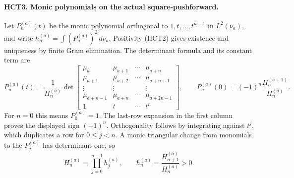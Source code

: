 \paragraph{HCT3. Monic polynomials on the actual square-pushforward.}
Let $P_n^{(a)}(t)$ be the monic polynomial orthogonal to
$1,t,\ldots,t^{n-1}$ in $L^2(\nu_a)$, and write
$h_n^{(a)}=\int(P_n^{(a)})^2\,d\nu_a$.
Positivity (HCT2) gives existence and uniqueness by finite
Gram elimination. The determinant formula and its constant term are
\begin{equation}\tag{HCT7}
 P_n^{(a)}(t)=\frac1{H_n^{(a)}}
 \det\begin{bmatrix}
 \mu_a&\mu_{a+1}&\cdots&\mu_{a+n}\\
 \mu_{a+1}&\mu_{a+2}&\cdots&\mu_{a+n+1}\\
 \vdots&\vdots&&\vdots\\
 \mu_{a+n-1}&\mu_{a+n}&\cdots&\mu_{a+2n-1}\\
 1&t&\cdots&t^n
 \end{bmatrix},\qquad
 P_n^{(a)}(0)=(-1)^n\frac{H_n^{(a+1)}}{H_n^{(a)}}.
\end{equation}
For $n=0$ this means $P_0^{(a)}=1$. The last-row expansion in the
first column proves the displayed sign $(-1)^n$. Orthogonality
follows by integrating against $t^j$, which duplicates a row for
$0\leq j<n$. A monic triangular change from monomials to the
$P_j^{(a)}$ has determinant one, so
\begin{equation}\tag{HCT8}
 H_n^{(a)}=\prod_{j=0}^{n-1}h_j^{(a)},\qquad
 h_n^{(a)}=\frac{H_{n+1}^{(a)}}{H_n^{(a)}}>0.
\end{equation}

